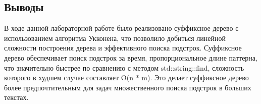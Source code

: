 \documentclass[12pt]{article}
\begin{document}
\subsection*{Выводы}


В ходе данной лабораторной работе было реализовано суффиксное дерево с использованием алгоритма Укконена, что позволило добиться линейной сложности построения дерева и эффективного поиска подстрок. Суффиксное дерево обеспечивает поиск подстрок за время, пропорциональное длине паттерна, что значительно быстрее по сравнению с методом std::string::find, сложность которого в худшем случае составляет O(n * m). Это делает суффиксное дерево более предпочтительным для задач множественного поиска подстрок в больших текстах. 
\end{document}
